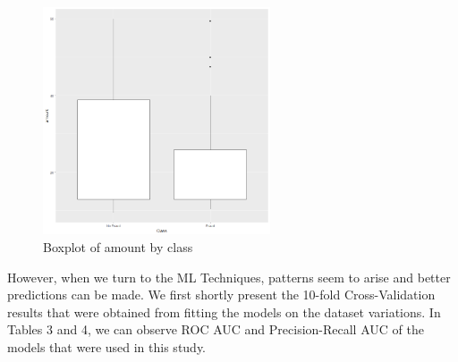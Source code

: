\documentclass[12pt,]{article}
\begin{document}
\begin{figure}
\centering
\includegraphics[width=0.6\textwidth,height=\textheight]{figures/ucsd/descriptive/boxplot_amount.png}
\caption{Boxplot of amount by class}
\end{figure}

However, when we turn to the ML Techniques, patterns seem to arise and
better predictions can be made. We first shortly present the 10-fold
Cross-Validation results that were obtained from fitting the models on
the dataset variations. In Tables 3 and 4, we can observe ROC AUC and
Precision-Recall AUC of the models that were used in this study.

\begin{table}

\caption{\label{tab:ucsd_models_AUC}UCSD: AUC Metric Model Variations}
\centering
{}
\end{table}
\end{document}
